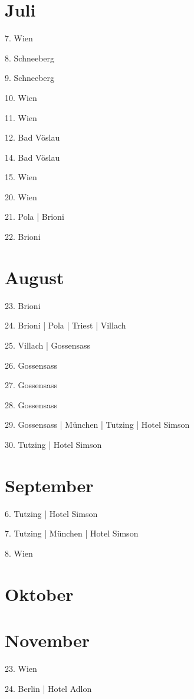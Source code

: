 \documentclass[twoside=false,titlepage=false,open=any, parskip=never, fontsize=10pt, headings=small, chapterprefix=false, appendixprefix=false, DIV=15]{scrbook}
\begin{document}
\begin{multicols}{3}
            \section*{Juli}
            7. Wien\par
            8. Schneeberg\par
            9. Schneeberg\par
            10. Wien\par
            11. Wien\par
            12. Bad Vöslau\par
            14. Bad Vöslau\par
            15. Wien\par
            20. Wien\par
            21. Pola | Brioni\par
            22. Brioni\par
            \section*{August}
            23. Brioni\par
            24. Brioni | Pola | Triest | Villach\par
            25. Villach | Gossensass\par
            26. Gossensass\par
            27. Gossensass\par
            28. Gossensass\par
            29. Gossensass | München | Tutzing | Hotel Simson\par
            30. Tutzing | Hotel Simson\par
            \section*{September}
            6. Tutzing | Hotel Simson\par
            7. Tutzing | München | Hotel Simson\par
            8. Wien\par
            \section*{Oktober}
            \section*{November}
            23. Wien\par
            24. Berlin | Hotel Adlon\par

\end{multicols}
\end{document}
